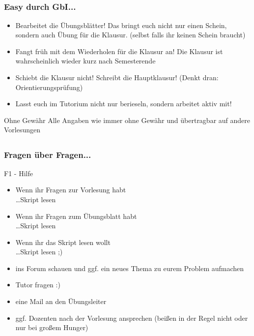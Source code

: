 \subsection*{}
\begin{frame}
	\frametitle{Easy durch GbI...}
	\begin{itemize}
		\item Bearbeitet die Übungsblätter! Das bringt euch nicht nur einen Schein,
		sondern auch Übung für die Klausur. (selbst falls ihr keinen Schein braucht)
		\pause
		\item Fangt früh mit dem Wiederholen für die Klausur an! Die Klausur ist wahrscheinlich wieder kurz nach Semesterende\pause
		\item Schiebt die Klausur nicht! Schreibt die Hauptklausur!
			(Denkt dran: Orientierungsprüfung)	\pause
		\item Lasst euch im Tutorium nicht nur berieseln, sondern arbeitet aktiv mit!
	\end{itemize}	\pause
 \begin{block}{Ohne Gewähr}
 	Alle Angaben wie immer ohne Gewähr und übertragbar auf andere Vorlesungen
 \end{block}
\end{frame}

\subsection*{}
\begin{frame}
\frametitle{Fragen über Fragen...}
\begin{block}{F1 - Hilfe}
	\begin{itemize}
  \item  Wenn ihr Fragen zur Vorlesung habt \\ \pause
          \ldots Skript lesen
  \item  Wenn ihr Fragen zum Übungsblatt habt \\ \pause
          \ldots Skript lesen
  \item  Wenn ihr das Skript lesen wollt \\ \pause
          \ldots Skript lesen ;) \pause
			\item ins Forum schauen und ggf. ein neues Thema zu eurem Problem aufmachen\pause
			\item Tutor fragen :)	\pause
			\item eine Mail an den Übungsleiter	\pause
			\item ggf. Dozenten nach der Vorlesung ansprechen (beißen in der Regel nicht oder nur bei großem Hunger)
	\end{itemize}
\end{block}
\end{frame}


